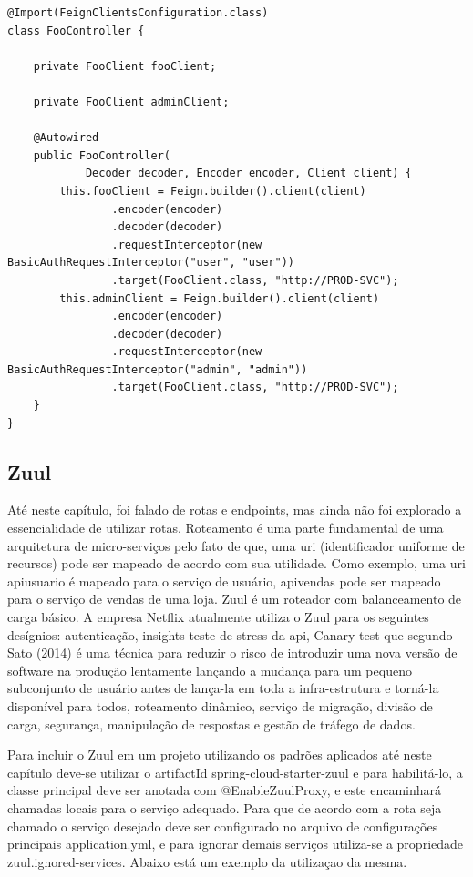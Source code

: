 \begin{verbatim}
@Import(FeignClientsConfiguration.class)
class FooController {

	private FooClient fooClient;

	private FooClient adminClient;

    @Autowired
	public FooController(
			Decoder decoder, Encoder encoder, Client client) {
		this.fooClient = Feign.builder().client(client)
				.encoder(encoder)
				.decoder(decoder)
				.requestInterceptor(new BasicAuthRequestInterceptor("user", "user"))
				.target(FooClient.class, "http://PROD-SVC");
		this.adminClient = Feign.builder().client(client)
				.encoder(encoder)
				.decoder(decoder)
				.requestInterceptor(new BasicAuthRequestInterceptor("admin", "admin"))
				.target(FooClient.class, "http://PROD-SVC");
    }
}
\end{verbatim}

\subsection{Zuul}

Até neste capítulo, foi falado de rotas e endpoints, mas ainda não foi explorado a essencialidade de utilizar rotas. Roteamento é uma parte fundamental de uma arquitetura de micro-serviços pelo fato de que, uma uri (identificador uniforme de recursos) pode ser mapeado de acordo com sua utilidade. Como exemplo, uma uri \/api\/usuario é mapeado para o serviço de usuário, \/api\/vendas pode ser mapeado para o serviço de vendas de uma loja. Zuul é um roteador com balanceamento de carga básico. A empresa Netflix atualmente utiliza o Zuul para os seguintes desígnios: autenticação, insights teste de stress da api, Canary test que segundo Sato (2014) é uma técnica para reduzir o risco de introduzir uma nova versão de software na produção lentamente lançando a mudança para um pequeno subconjunto de usuário antes de lança-la em toda a infra-estrutura e torná-la disponível para todos, roteamento dinâmico, serviço de migração, divisão de carga, segurança, manipulação de respostas e gestão de tráfego de dados.

Para incluir o Zuul em um projeto utilizando os padrões aplicados até neste capítulo deve-se utilizar o artifactId spring-cloud-starter-zuul e para habilitá-lo, a classe principal deve ser anotada com @EnableZuulProxy, e este encaminhará chamadas locais para o serviço adequado. Para que de acordo com a rota seja chamado o serviço desejado deve ser configurado no arquivo de configurações principais application.yml, e para ignorar demais serviços utiliza-se a propriedade zuul.ignored-services. Abaixo está um exemplo da utilizaçao da mesma.

